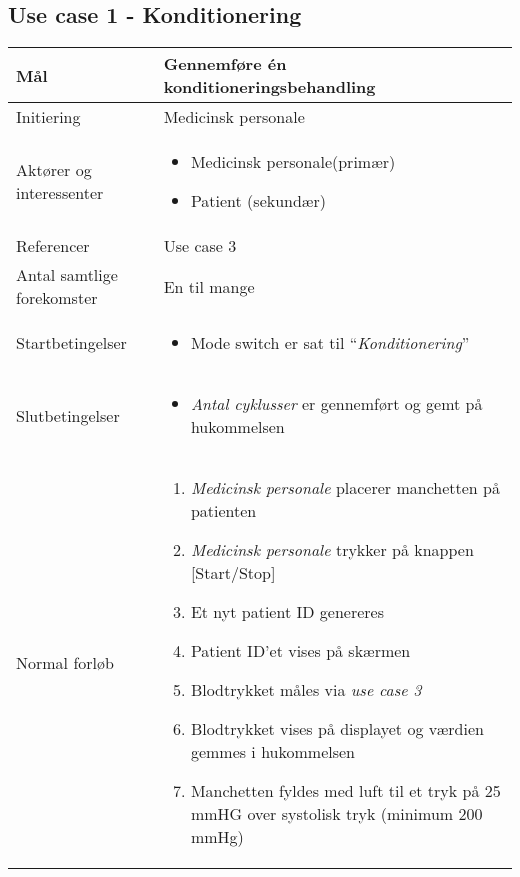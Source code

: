 \subsection{Use case 1 - Konditionering}
\begin{center}
		\begin{longtable}{ | p{} | p{}| } 
			\hline
			Mål & Gennemføre én konditioneringsbehandling  \\ 
			\hline
			Initiering &  Medicinsk personale\\
			\hline
			Aktører og interessenter & 
			\begin{itemize}
				\item Medicinsk personale(primær)
				\item Patient (sekundær)
			\end{itemize} \\ 
			\hline
			Referencer & Use case 3 \\ 
			\hline
			Antal samtlige forekomster & En til mange\\ 
			\hline	
			Startbetingelser & 
			\begin{itemize}
				\item Mode switch er sat til “\textit{Konditionering}”
			\end{itemize} \\ 
			\hline
			Slutbetingelser & 
			\begin{itemize}
				\item \textit{Antal cyklusser} er gennemført og gemt på hukommelsen
			\end{itemize} \\ 
			\hline
			Normal forløb & \begin{enumerate}
				\setlength\itemsep{0cm} %
				\item \textit{Medicinsk personale} placerer manchetten på patienten
				\item \textit{Medicinsk personale} trykker på knappen [Start/Stop]
				\subitem[Undtagelse \#1]
				\item Et nyt patient ID genereres
				\subitem[Undtagelse \#2] 
				\item Patient ID’et vises på skærmen
				\item Blodtrykket måles via \textit{use case 3}
				\item Blodtrykket vises på displayet og værdien gemmes i hukommelsen
				\item Manchetten fyldes med luft til et tryk på 25 mmHG over systolisk tryk (minimum 200 mmHg)					

\end{enumerate}
\end{longtable}
\end{center}
